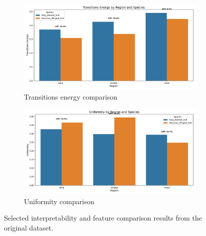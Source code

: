 \documentclass[a4paper,12pt]{report}
\begin{document}
\begin{figure}[H]
    \begin{subfigure}[t]{0.48\textwidth}
        \centering
        \includegraphics[width=\textwidth]{images/appendix/Original/transitions_energy_comparison.png}
        \caption{Transitions energy comparison}
    \end{subfigure}
    \hfill
    \begin{subfigure}[t]{0.48\textwidth}
        \centering
        \includegraphics[width=\textwidth]{images/appendix/Original/uniformity_comparison.png}
        \caption{Uniformity comparison}
    \end{subfigure}
    
    \caption{Selected interpretability and feature comparison results from the original dataset.}
\end{figure}
\end{document}
